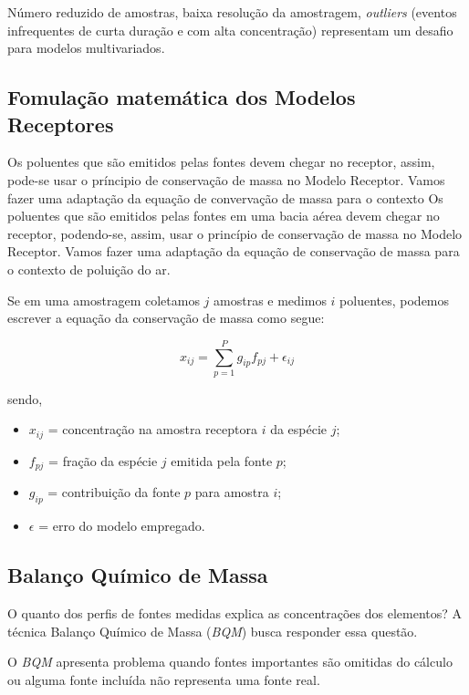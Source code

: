 Número reduzido de amostras, baixa resolução da amostragem, \textit{outliers} 
(eventos infrequentes de curta duração e com alta concentração) representam 
um desafio para modelos multivariados.

\subsection{Fomulação matemática dos Modelos Receptores}

Os poluentes que são emitidos pelas fontes devem chegar no receptor, assim, 
pode-se usar o príncipio de conservação de massa no Modelo Receptor. 
Vamos fazer uma adaptação da equação de convervação de massa para o contexto 
Os poluentes que são emitidos pelas fontes em uma bacia aérea devem 
chegar no receptor, podendo-se, assim, usar o princípio de conservação de massa no Modelo Receptor. 
Vamos fazer uma adaptação da equação de conservação de massa para o contexto 
de poluição do ar. 

Se em uma amostragem coletamos $j$ amostras e medimos $i$ poluentes, podemos 
escrever a equação da conservação de massa como segue: 

\begin{equation}
  x_{ij} = \sum_{p=1}^{P} g_{ip}f_{pj} + \epsilon_{ij}
\end{equation} 

sendo,
\begin{itemize}
  \item $x_{ij}$ = concentração na amostra receptora $i$ da espécie $j$;
  \item $f_{pj}$ = fração da espécie $j$ emitida pela fonte $p$;
  \item $g_{ip}$ = contribuição da fonte $p$ para amostra $i$;
  \item $\epsilon$ = erro do modelo empregado.
\end{itemize}

\subsection{Balanço Químico de Massa}

O quanto dos perfis de fontes medidas explica as concentrações dos elementos? 
A técnica Balanço Químico de Massa (\textit{BQM}) busca responder essa questão.

O \textit{BQM} apresenta problema quando fontes importantes são omitidas do
cálculo ou alguma fonte incluída não representa uma fonte real.

